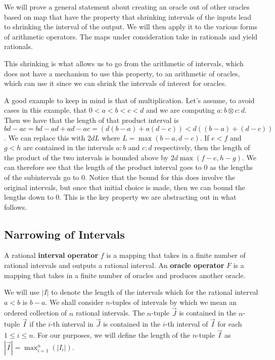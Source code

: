 \documentclass[12pt]{article}
\theoremstyle{remark}
\begin{document}
We will prove a general statement about creating an oracle out of other oracles based on map that have the property that shrinking intervals of the inputs lead to shrinking the interval of the output. We will then apply it to the various forms of arithmetic operators. The maps under consideration take in rationals and yield rationals. 

This shrinking is what allows us to go from the arithmetic of intervals, which does not have a mechanism to use this property, to an arithmetic of oracles, which can use it since we can shrink the intervals of interest for oracles. 

A good example to keep in mind is that of multiplication. Let's assume, to avoid cases in this example, that  $0 < a < b < c < d$ and we are computing $a:b \otimes c:d$. Then we have that the length of that product interval is $bd-ac = bd-ad+ad - ac= (d(b-a) + a(d-c))< d ( ( b-a) + (d-c) )$. We can replace this with $2dL$ where $L = \max(b-a, d-c)$. If $e<f$ and $g<h$ are contained in the intervals $a:b$ and $c:d$ respectively, then the length of the product of the two intervals is bounded above by $2d\max(f-e, h-g)$. We can therefore see that the length of the product interval goes to 0 as the lengths of the subintervals go to 0. Notice that the bound for this does involve the original intervals, but once that initial choice is made, then we can bound the lengths down to 0. This is the key property we are abstracting out in what follows. 

\subsection{Narrowing of Intervals}

A rational \textbf{interval operator} $f$ is a mapping that takes in a finite number of rational intervals and outputs a rational interval. An \textbf{oracle operator} $F$ is a mapping that takes in a finite number of oracles and produces another oracle.

We will use $|I|$ to denote the length of the intervals which for the rational interval $a<b$ is $b-a$. We shall consider $n$-tuples of intervals by which we mean an ordered collection of $n$ rational intervals. The $n$-tuple $\vec{J}$ is contained in the $n$-tuple $\vec{I}$ if the $i$-th interval in $\vec{J}$ is contained in the $i$-th interval of $\vec{I}$ for each $1 \leq i \leq n$. For our purposes, we will define the length of the $n$-tuple $\vec{I}$ as $|\vec{I}| = \max_{i=1}^n (|I_i|)$.
\end{document}
